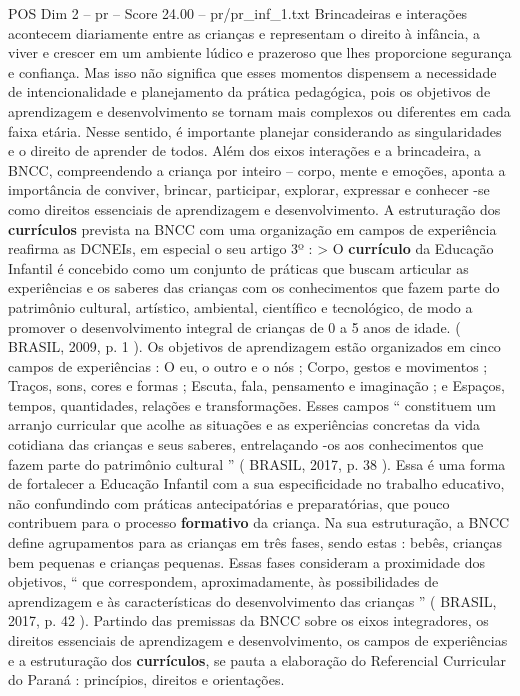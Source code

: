 \begin{textsample}{POS Dim 2 – pr – Score 24.00 – pr/pr\_inf\_1.txt}
Brincadeiras e interações acontecem diariamente entre as crianças e representam o direito à infância, a viver e crescer em um ambiente lúdico e prazeroso que lhes proporcione segurança e confiança.
Mas isso não significa que esses momentos dispensem a necessidade de intencionalidade e planejamento da prática pedagógica, pois os objetivos de aprendizagem e desenvolvimento se tornam mais complexos ou diferentes em cada faixa etária.
Nesse sentido, é importante planejar considerando as singularidades e o direito de aprender de todos.
Além dos eixos interações e a brincadeira, a BNCC, compreendendo a criança por inteiro – corpo, mente e emoções, aponta a importância de conviver, brincar, participar, explorar, expressar e conhecer -se como direitos essenciais de aprendizagem e desenvolvimento.
A estruturação dos \textbf{currículos} prevista na BNCC com uma organização em campos de experiência reafirma as DCNEIs, em especial o seu artigo 3º : > O \textbf{currículo} da Educação Infantil é concebido como um conjunto de práticas que buscam articular as experiências e os saberes das crianças com os conhecimentos que fazem parte do patrimônio cultural, artístico, ambiental, científico e tecnológico, de modo a promover o desenvolvimento integral de crianças de 0 a 5 anos de idade. ( BRASIL, 2009, p. 1 ).
Os objetivos de aprendizagem estão organizados em cinco campos de experiências : O eu, o outro e o nós ; Corpo, gestos e movimentos ; Traços, sons, cores e formas ; Escuta, fala, pensamento e imaginação ; e Espaços, tempos, quantidades, relações e transformações.
Esses campos “ constituem um arranjo curricular que acolhe as situações e as experiências concretas da vida cotidiana das crianças e seus saberes, entrelaçando -os aos conhecimentos que fazem parte do patrimônio cultural ” ( BRASIL, 2017, p. 38 ).
Essa é uma forma de fortalecer a Educação Infantil com a sua especificidade no trabalho educativo, não confundindo com práticas antecipatórias e preparatórias, que pouco contribuem para o processo \textbf{formativo} da criança.
Na sua estruturação, a BNCC define agrupamentos para as crianças em três fases, sendo estas : bebês, crianças bem pequenas e crianças pequenas.
Essas fases consideram a proximidade dos objetivos, “ que correspondem, aproximadamente, às possibilidades de aprendizagem e às características do desenvolvimento das crianças ” ( BRASIL, 2017, p. 42 ).
Partindo das premissas da BNCC sobre os eixos integradores, os direitos essenciais de aprendizagem e desenvolvimento, os campos de experiências e a estruturação dos \textbf{currículos}, se pauta a elaboração do Referencial Curricular do Paraná : princípios, direitos e orientações.

\end{textsample}
